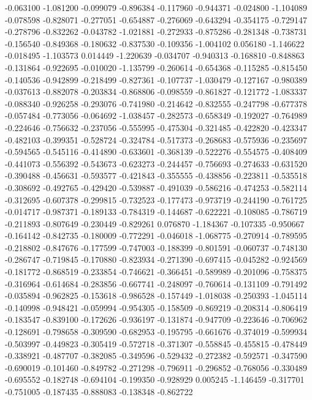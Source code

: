 -0.063100
-1.081200
-0.099079
-0.896384
-0.117960
-0.944371
-0.024800
-1.104089
-0.078598
-0.828071
-0.277051
-0.654887
-0.276069
-0.643294
-0.354175
-0.729147
-0.278796
-0.832262
-0.043782
-1.021881
-0.272933
-0.875286
-0.281348
-0.738731
-0.156540
-0.849368
-0.180632
-0.837530
-0.109356
-1.004102
0.056180
-1.146622
-0.018495
-1.103573
0.014449
-1.220639
-0.034707
-0.940313
-0.168810
-0.848863
-0.131864
-0.922695
-0.010020
-1.135799
-0.260614
-0.654368
-0.115285
-0.815450
-0.140536
-0.942899
-0.218499
-0.827361
-0.107737
-1.030479
-0.127167
-0.980389
-0.037613
-0.882078
-0.203834
-0.868806
-0.098559
-0.861827
-0.121772
-1.083337
-0.088340
-0.926258
-0.293076
-0.741980
-0.214642
-0.832555
-0.247798
-0.677378
-0.057484
-0.773056
-0.064692
-1.038457
-0.282573
-0.658349
-0.192027
-0.764989
-0.224646
-0.756632
-0.237056
-0.555995
-0.475304
-0.321485
-0.422820
-0.423347
-0.482103
-0.399351
-0.528724
-0.324784
-0.517373
-0.268683
-0.575936
-0.235697
-0.594565
-0.545116
-0.414890
-0.633601
-0.368139
-0.522276
-0.554575
-0.408409
-0.441073
-0.556392
-0.543673
-0.623273
-0.244457
-0.756693
-0.274633
-0.631520
-0.390488
-0.456631
-0.593577
-0.421843
-0.355555
-0.438856
-0.223811
-0.535518
-0.308692
-0.492765
-0.429420
-0.539887
-0.491039
-0.586216
-0.474253
-0.582114
-0.312695
-0.607378
-0.299815
-0.732523
-0.177473
-0.973719
-0.244190
-0.761725
-0.014717
-0.987371
-0.189133
-0.784319
-0.144687
-0.622221
-0.108085
-0.786719
-0.211893
-0.807649
-0.230449
-0.829261
0.076870
-1.184367
-0.107335
-0.950667
-0.164142
-0.842735
-0.180009
-0.772291
-0.046018
-1.068775
-0.270914
-0.789595
-0.218802
-0.847676
-0.177599
-0.747003
-0.188399
-0.801591
-0.060737
-0.748130
-0.286747
-0.719845
-0.170880
-0.823934
-0.271390
-0.697415
-0.045282
-0.924569
-0.181772
-0.868519
-0.233854
-0.746621
-0.366451
-0.589989
-0.201096
-0.758375
-0.316964
-0.614684
-0.283856
-0.667741
-0.248097
-0.760614
-0.131109
-0.791492
-0.035894
-0.962825
-0.153618
-0.986528
-0.157449
-1.018038
-0.250393
-1.045114
-0.140998
-0.948421
-0.059994
-0.954305
-0.158509
-0.869219
-0.208314
-0.806419
-0.183547
-0.839100
-0.172626
-0.936197
-0.131874
-0.947709
-0.223646
-0.706962
-0.128691
-0.798658
-0.309590
-0.682953
-0.195795
-0.661676
-0.374019
-0.599934
-0.503997
-0.449823
-0.305419
-0.572718
-0.371307
-0.558845
-0.455815
-0.478449
-0.338921
-0.487707
-0.382085
-0.349596
-0.529432
-0.272382
-0.592571
-0.347590
-0.690019
-0.101460
-0.849782
-0.271298
-0.796911
-0.296852
-0.768056
-0.330489
-0.695552
-0.182748
-0.694104
-0.199350
-0.928929
0.005245
-1.146459
-0.317701
-0.751005
-0.187435
-0.888083
-0.138348
-0.862722
